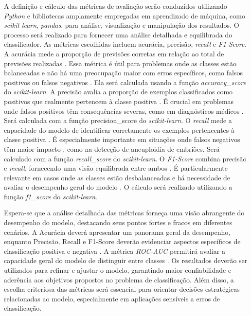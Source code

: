 A definição e cálculo das métricas de avaliação serão conduzidos utilizando \textit{Python} e bibliotecas amplamente empregadas em aprendizado de máquina, como \textit{scikit-learn}, \textit{pandas}, para análise, visualização e manipulação dos resultados. O processo será realizado para fornecer uma análise detalhada e equilibrada do classificador. As métricas escolhidas incluem acurácia, precisão, \textit{recall} e \textit{F1-Score}. A acurácia mede a proporção de previsões corretas em relação ao total de previsões realizadas \cite{vilela2022}. Essa métrica é útil para problemas onde as classes estão balanceadas e não há uma preocupação maior com erros específicos, como falsos positivos ou falsos negativos \cite{vilela2022}. Ela será calculada usando a função \textit{accuracy\_score} do \textit{scikit-learn}. A precisão avalia a proporção de exemplos classificados como positivos que realmente pertencem à classe positiva \cite{vilela2022}. É crucial em problemas onde falsos positivos têm consequências severas, como em diagnósticos médicos \cite{vilela2022}. Será calculada com a função precision\_score do \textit{scikit-learn}. O \textit{recall} mede a capacidade do modelo de identificar corretamente os exemplos pertencentes à classe positiva \cite{vilela2022}. É especialmente importante em situações onde falsos negativos têm maior impacto \cite{vilela2022}, como na detecção de aneuploidia de embriões. Será calculado com a função \textit{recall\_score} do \textit{scikit-learn}. O \textit{F1-Score} combina precisão e \textit{recall}, fornecendo uma visão equilibrada entre ambos \cite{vilela2022}. É particularmente relevante em casos onde as classes estão desbalanceadas e há necessidade de avaliar o desempenho geral do modelo \cite{vilela2022}. O cálculo será realizado utilizando a função \textit{f1\_score} do \textit{scikit-learn}.

Espera-se que a análise detalhada das métricas forneça uma visão abrangente do desempenho do modelo, destacando seus pontos fortes e fracos em diferentes cenários. A Acurácia deverá apresentar um panorama geral da desempenho, enquanto Precisão, Recall e F1-Score deverão evidenciar aspectos específicos de classificação positiva e negativa \cite{vilela2022}. A métrica \textit{ROC-AUC} permitirá avaliar a capacidade geral do modelo de distinguir entre classes \cite{vilela2022}. Os resultados deverão ser utilizados para refinar e ajustar o modelo, garantindo maior confiabilidade e aderência aos objetivos propostos no problema de classificação. Além disso, a escolha criteriosa das métricas será essencial para orientar decisões estratégicas relacionadas ao modelo, especialmente em aplicações sensíveis a erros de classificação.


